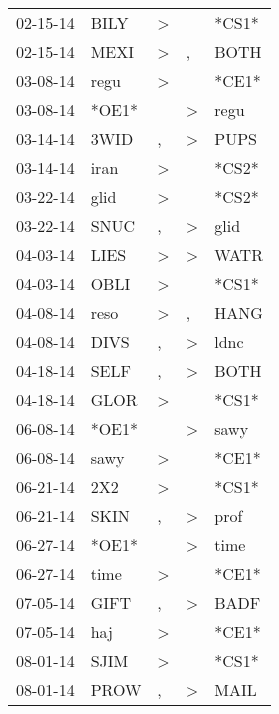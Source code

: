 \begin{supertabular}{lllll}
 02-15-14 &   BILY &     \textgreater &                  &  *CS1* \\
 02-15-14 &   MEXI &     \textgreater &                , &   BOTH \\
 03-08-14 &   regu &     \textgreater &                  &  *CE1* \\
 03-08-14 &  *OE1* &                  &     \textgreater &   regu \\
 03-14-14 &   3WID &                , &     \textgreater &   PUPS \\
 03-14-14 &   iran &     \textgreater &                  &  *CS2* \\
 03-22-14 &   glid &     \textgreater &                  &  *CS2* \\
 03-22-14 &   SNUC &                , &     \textgreater &   glid \\
 04-03-14 &   LIES &     \textgreater &     \textgreater &   WATR \\
 04-03-14 &   OBLI &     \textgreater &                  &  *CS1* \\
 04-08-14 &   reso &     \textgreater &                , &   HANG \\
 04-08-14 &   DIVS &                , &     \textgreater &   ldnc \\
 04-18-14 &   SELF &                , &     \textgreater &   BOTH \\
 04-18-14 &   GLOR &     \textgreater &                  &  *CS1* \\
 06-08-14 &  *OE1* &                  &     \textgreater &   sawy \\
 06-08-14 &   sawy &     \textgreater &                  &  *CE1* \\
 06-21-14 &    2X2 &     \textgreater &                  &  *CS1* \\
 06-21-14 &   SKIN &                , &     \textgreater &   prof \\
 06-27-14 &  *OE1* &                  &     \textgreater &   time \\
 06-27-14 &   time &     \textgreater &                  &  *CE1* \\
 07-05-14 &   GIFT &                , &     \textgreater &   BADF \\
 07-05-14 &    haj &     \textgreater &                  &  *CE1* \\
 08-01-14 &   SJIM &     \textgreater &                  &  *CS1* \\
 08-01-14 &   PROW &                , &     \textgreater &   MAIL \\

\end{supertabular}
